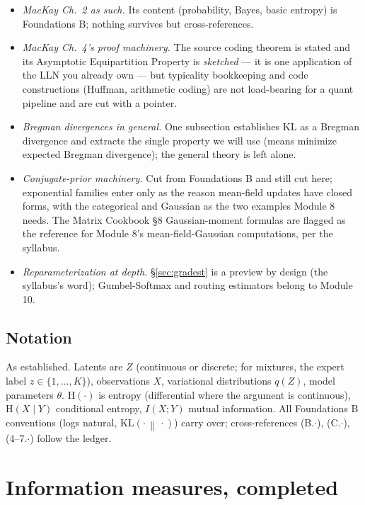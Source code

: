 \documentclass[11pt]{article}
\numberwithin{equation}{section}
\theoremstyle{plain}
\theoremstyle{definition}
\theoremstyle{remark}
\newcommand{\KL}[2]{\mathrm{KL}\!\left(#1 \,\middle\|\, #2\right)}
\newcommand{\Hent}{\mathrm{H}}
\begin{document}
\begin{itemize}[leftmargin=2em,itemsep=0.15em]
\item \emph{MacKay Ch.\ 2 as such.} Its content (probability, Bayes, basic entropy) is Foundations B; nothing survives but cross-references.
\item \emph{MacKay Ch.\ 4's proof machinery.} The source coding theorem is stated and its Asymptotic Equipartition Property is \emph{sketched} --- it is one application of the LLN you already own --- but typicality bookkeeping and code constructions (Huffman, arithmetic coding) are not load-bearing for a quant pipeline and are cut with a pointer.
\item \emph{Bregman divergences in general.} One subsection establishes KL as a Bregman divergence and extracts the single property we will use (means minimize expected Bregman divergence); the general theory is left alone.
\item \emph{Conjugate-prior machinery.} Cut from Foundations B and still cut here; exponential families enter only as the reason mean-field updates have closed forms, with the categorical and Gaussian as the two examples Module 8 needs. The Matrix Cookbook \S8 Gaussian-moment formulas are flagged as the reference for Module 8's mean-field-Gaussian computations, per the syllabus.
\item \emph{Reparameterization at depth.} \S\ref{sec:gradest} is a preview by design (the syllabus's word); Gumbel-Softmax and routing estimators belong to Module 10.
\end{itemize}

\subsection*{Notation}

As established. Latents are $Z$ (continuous or discrete; for mixtures, the expert label $z \in \{1,\dots,K\}$), observations $X$, variational distributions $q(Z)$, model parameters $\theta$. $\Hent(\cdot)$ is entropy (differential where the argument is continuous), $\Hent(X \mid Y)$ conditional entropy, $I(X;Y)$ mutual information. All Foundations B conventions (logs natural, $\KL{\cdot}{\cdot}$) carry over; cross-references (B.$\cdot$), (C.$\cdot$), (4--7.$\cdot$) follow the ledger.

\section{Information measures, completed}\label{sec:info}
\end{document}
